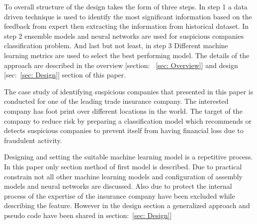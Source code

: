 To overall structure of the design takes the form of three steps. In step 1 a data driven technique is used to identify the most significant information based on the feedback from expert then extracting the information from historical dataset. In step 2 ensemble models and neural networks are used for suspicious companies classification problem. And last but not least, in step 3 Different machine learning metrics are used to select the best performing model. The details of the approach are described in the overview [section: ~\ref{sec: Overview}] and design [sec:~\ref{sec: Design}] section of this paper.


The case study of identifying suspicious companies that presented in this paper is conducted for one of the leading trade insurance company. The interested company has foot print over different locations in the world. The target of the company to reduce risk by preparing a classification model which recommends or detects suspicious companies to prevent itself from having financial loss due to fraudulent activity.


Designing and setting the suitable machine learning model is a repetitive process. In this paper only section method of first model is described. Due to practical constrain not all other machine learning models and configuration of assembly models and neural networks are discussed. Also due to protect the internal process of the expertise of the insurance company have been excluded while describing the feature. However in the design section a generalized approach and pseudo code have been shared in section:~\ref{sec: Design}]






